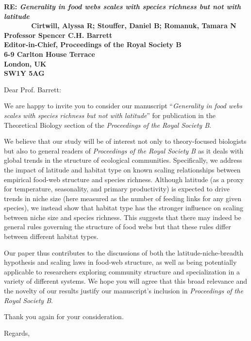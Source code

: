 \documentclass[12pt]{letter}
\newcommand{\mytitle}{\emph{Generality in food webs scales with species richness but not with latitude}}
\newcommand{\myjournal}{\emph{Proceedings of the Royal Society B}}
\begin{document}
\begin{letter}{\bf RE: \mytitle\\
               ~~~~~~~Cirtwill, Alyssa R; Stouffer, Daniel B; Romanuk, Tamara N\\
               \vspace*{20pt}
               Professor Spencer C.H. Barrett\\
               Editor-in-Chief, Proceedings of the Royal Society B\\
               6-9 Carlton House Terrace\\
               London, UK\\
               SW1Y 5AG\\
                }

\opening{Dear Prof. Barrett:}

We are happy to invite you to consider our manuscript 
``\mytitle'' for publication in the Theoretical Biology section of the \emph{\myjournal}. 


We believe that our study will be of interest not only to theory-focused biologists but also to general readers
of \emph{\myjournal} as it deals with global trends in the structure of ecological communities. 
Specifically, we address the impact of latitude and habitat type on known scaling relationships between empirical
food-web structure and species richness. Although latitude (as a proxy for temperature, seasonality, and primary 
productivity) is expected to drive trends in niche size (here measured as the number of feeding links for any 
given species), we instead show that habitat type has the stronger influence on scaling between niche size and 
species richness. This suggests that there may indeed be general rules governing the structure of food webs but 
that these rules differ between different habitat types.


Our paper thus contributes to the discussions of both the latitude-niche-breadth hypothesis and scaling
laws in food-web structure, as well as being potentially applicable to researchers exploring community 
structure and specialization in a variety of different systems. We hope you will agree that this broad relevance
and the novelty of our results justify our manuscript's inclusion in \emph{\myjournal}.

Thank you again for your consideration.

\closing{Regards,}


\end{letter}


\end{document}
